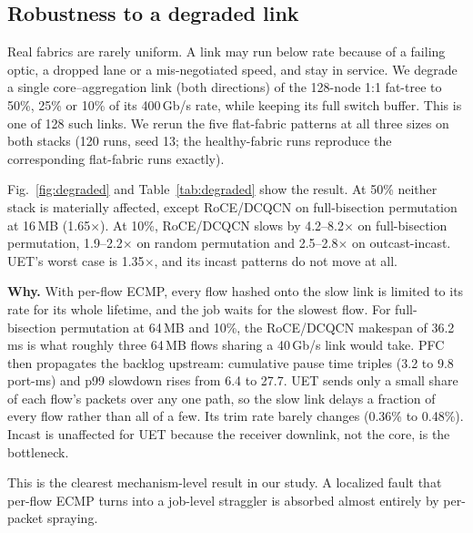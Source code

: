 \documentclass[conference]{IEEEtran}
\begin{document}
\subsection{Robustness to a degraded link}
\label{sec:degraded}

Real fabrics are rarely uniform. A link may run below rate because of a failing
optic, a dropped lane or a mis-negotiated speed, and stay in service. We degrade
a single core--aggregation link (both directions) of the 128-node 1:1 fat-tree
to 50\%, 25\% or 10\% of its 400\,Gb/s rate, while keeping its full switch
buffer. This is one of 128 such links. We rerun the five flat-fabric patterns at
all three sizes on both stacks (120 runs, seed 13; the healthy-fabric runs
reproduce the corresponding flat-fabric runs exactly).


\begin{table}[t]
\centering
\caption{Makespan slowdown from one degraded link (range over 16/64/100\,MB).}
\label{tab:degraded}
\footnotesize
\setlength{\tabcolsep}{3.5pt}

\end{table}

Fig.~\ref{fig:degraded} and Table~\ref{tab:degraded} show the result.
At 50\% neither stack is materially affected, except RoCE/DCQCN on full-bisection
permutation at 16\,MB (1.65$\times$). At 10\%, RoCE/DCQCN slows by
4.2--8.2$\times$ on full-bisection permutation, 1.9--2.2$\times$ on random
permutation and 2.5--2.8$\times$ on outcast-incast. UET's worst case is
1.35$\times$, and its incast patterns do not move at all.

\textbf{Why.}
With per-flow ECMP, every flow hashed onto the slow link is limited to its rate
for its whole lifetime, and the job waits for the slowest flow. For
full-bisection permutation at 64\,MB and 10\%, the RoCE/DCQCN makespan of
36.2\,ms is what roughly three 64\,MB flows sharing a 40\,Gb/s link would take.
PFC then propagates the backlog upstream: cumulative pause time triples (3.2
to 9.8 port-ms) and p99 slowdown rises from 6.4 to 27.7. UET sends only a small share
of each flow's packets over any one path, so the slow link delays a fraction of
every flow rather than all of a few. Its trim rate barely changes (0.36\% to
0.48\%). Incast is unaffected for UET because the receiver downlink, not the
core, is the bottleneck.

This is the clearest mechanism-level result in our study. A localized fault
that per-flow ECMP turns into a job-level straggler is absorbed almost entirely
by per-packet spraying.
\end{document}

